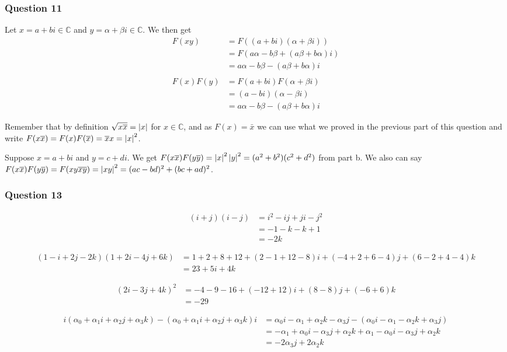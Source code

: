 \documentclass{article}
\begin{document}
\subsubsection{Question 11}
 Let $x = a + bi \in \mathbb C$ and $y = \alpha + \beta i\in\mathbb C$. We then get 
\begin{align*}
F(xy) &= F((a+bi)(\alpha+\beta i))\\
&= F(a\alpha-b\beta+(a\beta+b\alpha)i) \\
&= a\alpha-b\beta-(a\beta+b\alpha)i \\ \\
F(x)F(y) &= F(a+bi)F(\alpha+\beta i) \\ 
&= (a-bi)(\alpha-\beta i)\\
&= a\alpha - b\beta - (a\beta +b\alpha) i
\end{align*}


Remember that by definition $\sqrt{x\overline x} = \left|{x}\right|$ for $x \in \mathbb C$, and as $F(x) = \bar x$ we can use what we proved in the previous part of this question and write $F(x\overline x) = F(x)F(\overline x) = \overline xx = \left|{x}\right|^2$.

 Suppose $x = a + bi$ and $y = c +di$. We get $F(x\overline x)F(y\overline y) = \left|{x}\right|^2\left|{y}\right|^2 = (a^2+b^2)(c^2+d^2)$ from part b. We also can say $F(x\overline x)F(y\overline y) = F(xy\overline{xy}) = \left|{xy}\right|^2 = (ac-bd)^2+(bc+ad)^2$.


\subsubsection{Question 13}

\begin{align*}
(i+j)(i-j) &= i^2-ij+ji-j^2 \\
&= -1-k-k+1\\
& = -2k
\end{align*}

\begin{align*}
(1-i+2j-2k)(1+2i-4j+6k) &= 1+2+8+12 + (2-1+12-8)i+(-4+2+6-4)j+(6-2+4-4)k \\
&= 23 + 5i+4k
\end{align*}

\begin{align*}
(2i-3j+4k)^2 &= -4-9-16+(-12+12)i+(8-8)j+(-6+6)k\\
&= -29
\end{align*}

\begin{align*}
i(\alpha_0+\alpha_1i+\alpha_2j+\alpha_3k)-(\alpha_0+\alpha_1i+\alpha_2j+\alpha_3k)i &= \alpha_0i-\alpha_1+\alpha_2k-\alpha_3j-(\alpha_0i-\alpha_1-\alpha_2k+\alpha_3j) \\
&= -\alpha_1+\alpha_0i-\alpha_3j+\alpha_2k+\alpha_1-\alpha_0i-\alpha_3j+\alpha_2k \\
&= -2\alpha_3j+2\alpha_2k
\end{align*}
\end{document}
